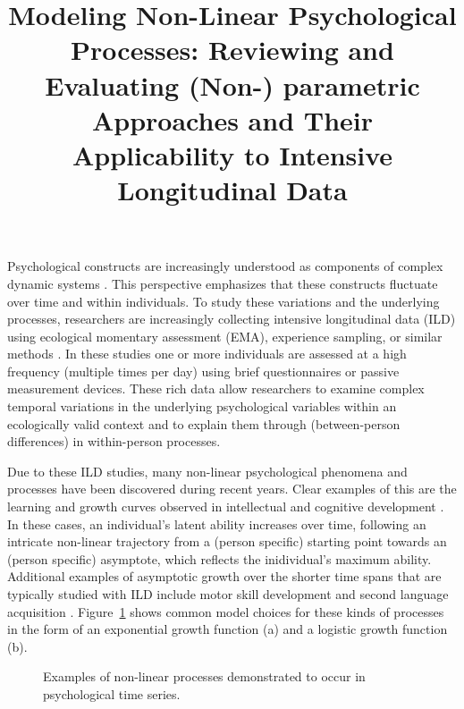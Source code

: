 \documentclass[man, floatsintext]{apa7}
\title{Modeling Non-Linear Psychological Processes: Reviewing and Evaluating
  (Non-) parametric Approaches and Their Applicability to Intensive
  Longitudinal Data}
\begin{document}
\maketitle

Psychological constructs are increasingly understood as components of complex
dynamic systems \parencite{nesselroade_studying_2004, wang_investigating_2012}.
This perspective emphasizes that these constructs fluctuate over time and
within individuals. To study these variations and the underlying processes,
researchers are increasingly collecting intensive longitudinal data (ILD) using
ecological momentary assessment (EMA), experience sampling, or similar methods
\parencite{fritz_so_2023}. In these studies one or more individuals are
assessed at a high frequency (multiple times per day) using brief
questionnaires or passive measurement devices. These rich data allow
researchers to examine complex temporal variations in the underlying
psychological variables within an ecologically valid context and to explain
them through (between-person differences) in within-person processes.

Due to these ILD studies, many non-linear psychological phenomena and processes
have been discovered during recent years. Clear examples of this are the
learning and growth curves observed in intellectual and cognitive development
\parencite{kunnen_dynamic_2012, mcardle_comparative_2002}. In these cases, an
individual's latent ability increases over time, following an intricate
non-linear trajectory from a (person specific) starting point towards an
(person specific) asymptote, which reflects the inidividual's maximum ability.
Additional examples of asymptotic growth over the shorter time spans that are
typically studied with ILD include motor skill development
\parencite{newell_time_2001} and second language acquisition
\parencite{de_bot_dynamic_2007}. Figure~\ref{fig:examplar_npn} shows
common model choices for these kinds of processes in the form of an
exponential growth function (a) and a logistic growth function (b).

\begin{figure}[!ht]
  \caption{Examples of non-linear processes demonstrated to occur in
    psychological time series.}
  \label{fig:examplar_npn}
\end{figure}
\end{document}
